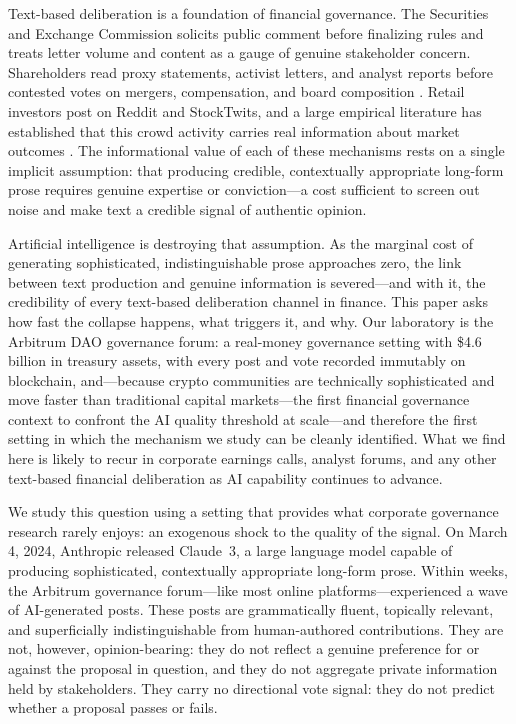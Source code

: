 \documentclass[12pt]{article}
\begin{document}
Text-based deliberation is a foundation of financial governance. The Securities
and Exchange Commission solicits public comment before finalizing rules and treats
letter volume and content as a gauge of genuine stakeholder concern. Shareholders
read proxy statements, activist letters, and analyst reports before contested votes
on mergers, compensation, and board composition \citep{iliev2015}. Retail investors
post on Reddit and StockTwits, and a large empirical literature has established that
this crowd activity carries real information about market outcomes
\citep{antweiler2004, chen2014}. The informational value of each of these mechanisms
rests on a single implicit assumption: that producing credible, contextually
appropriate long-form prose requires genuine expertise or conviction---a cost
sufficient to screen out noise and make text a credible signal of authentic opinion.

Artificial intelligence is destroying that assumption. As the marginal cost of
generating sophisticated, indistinguishable prose approaches zero, the link between
text production and genuine information is severed---and with it, the credibility of
every text-based deliberation channel in finance. This paper asks how fast the
collapse happens, what triggers it, and why. Our laboratory is the Arbitrum DAO
governance forum: a real-money governance setting with \$4.6 billion in treasury
assets, with every post and vote recorded immutably on blockchain, and---because crypto
communities are technically sophisticated and move faster than traditional capital
markets---the first financial governance context to confront the AI quality threshold
at scale---and therefore the first setting in which the mechanism we study can
be cleanly identified. What we find here is likely to recur in corporate earnings
calls, analyst forums, and any other text-based financial deliberation as AI
capability continues to advance.

We study this question using a setting that provides what corporate governance
research rarely enjoys: an exogenous shock to the quality of the signal. On March 4,
2024, Anthropic released Claude~3, a large language model capable of producing
sophisticated, contextually appropriate long-form prose. Within weeks, the
Arbitrum governance forum---like most online platforms---experienced a wave of
AI-generated posts. These posts are grammatically fluent, topically relevant, and
superficially indistinguishable from human-authored contributions. They are not,
however, opinion-bearing: they do not reflect a genuine preference for or against the
proposal in question, and they do not aggregate private information held by
stakeholders. They carry no directional vote signal: they do not predict whether a proposal passes or fails.
\end{document}
